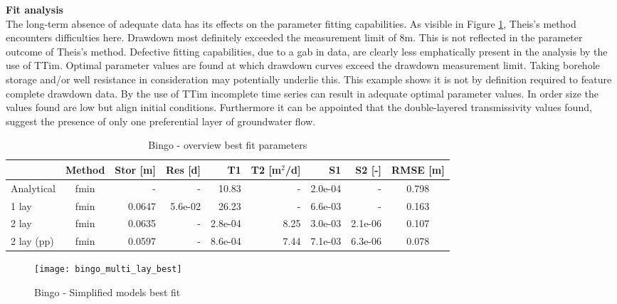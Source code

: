 \textbf{Fit analysis} \\
The long-term absence of adequate data has its effects on the parameter fitting capabilities. As visible in Figure \ref{fig:Bingo_best}, Theis's method encounters difficulties here. Drawdown most definitely exceeded the measurement limit of 8m. This is not reflected in the parameter outcome of Theis's method. Defective fitting capabilities, due to a gab in data, are clearly less emphatically present in the analysis by the use of TTim.  Optimal parameter values are found at which drawdown curves exceed the drawdown measurement limit. Taking borehole storage and/or well resistance in consideration may potentially underlie this. This example shows it is not by definition required to feature complete drawdown data. By the use of TTim incomplete time series can result in adequate optimal parameter values. In order size the values found are low but align initial conditions. Furthermore it can be appointed that the double-layered transmissivity values found, suggest the presence of only one preferential layer of groundwater flow. \\

\begin{table}[h!]
\small
\centering
\caption{Bingo - overview best fit parameters}
\label{tab:bing_table}
\begin{tabular}{l|c|r|r|rr|rr|c}
\hline 
\textbf{}       & \textbf{Method} & \textbf{Stor [m]} & \textbf{Res [d]} & \textbf{T1}  & \textbf{T2   [m$^2$/d]}  & \textbf{S1}  & \textbf{S2 [-]}  & \textbf{RMSE [m]} \\ \hline \hline
Analytical                & fmin             & -             & -            & 10.83      & -          & 2.0e-04    & -          & 0.798 \\
1 lay                     & fmin             & 0.0647        & 5.6e-02      & 26.23      & -          & 6.6e-03    & -          & 0.163 \\
2 lay                     & fmin             & 0.0635        & -            & 2.8e-04    & 8.25      & 3.0e-03    & 2.1e-06    & 0.107 \\
2 lay (pp)                & fmin             & 0.0597        & -            & 8.6e-04    & 7.44      & 7.1e-03    & 6.3e-06    & 0.078 \\ \hline    
\end{tabular}
\end{table}

\begin{figure}[h!]
 \centering
 \texttt{[image: bingo\_multi\_lay\_best]}
 \captionsetup{justification=centering} 
 \caption{Bingo - Simplified models best fit}
 \label{fig:Bingo_best}
\end{figure}

